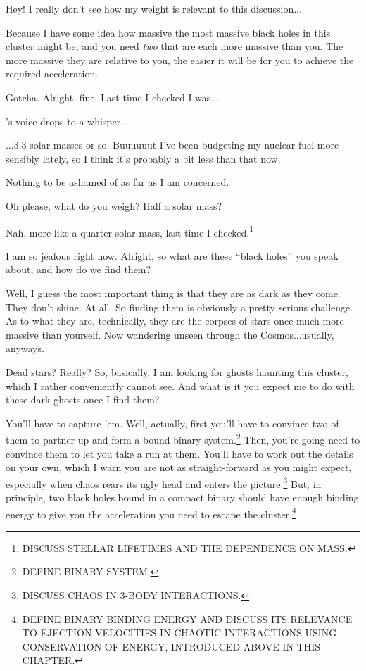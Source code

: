 \documentclass[main.tex]{subfiles}
\begin{document}
\newpara \Sterope Hey! I really don't see how my weight is relevant to this discussion...

\newpara \Enrico Because I have some idea how massive the most massive black holes in this cluster might be, and you need \textit{two} that are each more massive than you.  The more massive they are relative to you, the easier it will be for you to achieve the required acceleration.

\newpara \Sterope Gotcha.  Alright, fine.  Last time I checked I was...

\newpara \nar \rmsterope's voice drops to a whisper...

\newpara \Sterope ...3.3 solar masses or so.  Buuuuuut I've been budgeting my nuclear fuel more sensibly lately, so I think it's probably a bit less than that now.  

\newpara \Enrico Nothing to be ashamed of as far as I am concerned.

\newpara \Sterope Oh please, what do you weigh?  Half a solar mass?

\newpara \Enrico Nah, more like a quarter solar mass, last time I checked.\footnote{DISCUSS STELLAR LIFETIMES AND THE DEPENDENCE ON MASS.}

\newpara \Sterope I am so jealous right now.  Alright, so what are these ``black holes'' you speak about, and how do we find them?

\newpara \Enrico Well, I guess the most important thing is that they are as dark as they come.  They don't shine.  At all.  So finding them is obviously a pretty serious challenge.  As to what they are, technically, they are the corpses of stars once much more massive than yourself.  Now wandering unseen through the Cosmos...usually, anyways.

\newpara \Sterope  Dead stars?  Really?  So, basically, I am looking for ghosts haunting this cluster, which I rather conveniently cannot see.  And what is it you expect me to do with these dark ghosts once I find them?

\newpara \Enrico You'll have to capture 'em.  Well, actually, first you'll have to convince two of them to partner up and form a bound binary system.\footnote{DEFINE BINARY SYSTEM.}  Then, you're going need to convince them to let you take a run at them.  You'll have to work out the details on your own, which I warn you are not as straight-forward as you might expect, especially when chaos rears its ugly head and enters the picture.\footnote{DISCUSS CHAOS IN 3-BODY INTERACTIONS.}  But, in principle, two black holes bound in a compact binary should have enough binding energy to give you the acceleration you need to escape the cluster.\footnote{DEFINE BINARY BINDING ENERGY AND DISCUSS ITS RELEVANCE TO EJECTION VELOCITIES IN CHAOTIC INTERACTIONS USING CONSERVATION OF ENERGY, INTRODUCED ABOVE IN THIS CHAPTER.}  
\end{document}
